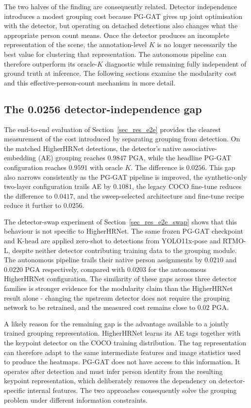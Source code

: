 The two halves of the finding are consequently related.
Detector independence introduces a modest grouping cost because PG-GAT
gives up joint optimisation with the detector,
but operating on detached detections also changes what the appropriate
person count means.
Once the detector produces an incomplete representation of the scene,
the annotation-level $K$ is no longer necessarily the best value for
clustering that representation.
The autonomous pipeline can therefore outperform its oracle-$K$
diagnostic while remaining fully independent of ground truth at inference.
The following sections examine the modularity cost and this
effective-person-count mechanism in more detail.

\subsection{The 0.0256 detector-independence gap}
\label{sec_disc_modularity_autonomy_gap}

The end-to-end evaluation of Section~\ref{sec_res_e2e} provides the
clearest measurement of the cost introduced by separating grouping from
detection.
On the matched HigherHRNet detections, the detector's native
associative-embedding (AE) grouping reaches $0.9847$ PGA,
while the headline PG-GAT configuration reaches $0.9591$ with oracle $K$.
The difference is $0.0256$.
This gap also narrows consistently as the PG-GAT pipeline is improved,
the synthetic-only two-layer configuration trails AE by $0.1081$,
the legacy COCO fine-tune reduces the difference to $0.0417$,
and the sweep-selected architecture and fine-tune recipe reduce it
further to $0.0256$.

The detector-swap experiment of Section~\ref{sec_res_e2e_swap} shows
that this behaviour is not specific to HigherHRNet.
The same frozen PG-GAT checkpoint and K-head are applied zero-shot to
detections from YOLO11x-pose and RTMO-L,
despite neither detector contributing training data to the grouping module.
The autonomous pipeline trails their native person assignments by
$0.0210$ and $0.0220$ PGA respectively,
compared with $0.0203$ for the autonomous HigherHRNet configuration.
The similarity of these gaps across three detector families is stronger
evidence for the modularity claim than the HigherHRNet result alone -
changing the upstream detector does not require the grouping network
to be retrained,
and the measured cost remains close to $0.02$ PGA.

A likely reason for the remaining gap is the advantage available to a
jointly trained grouping representation.
HigherHRNet learns its AE tags together with the keypoint detector on
the COCO training distribution.
The tag representation can therefore adapt to the same intermediate
features and image statistics used to produce the heatmaps.
PG-GAT does not have access to this information.
It operates after detection and must infer person identity from the
resulting keypoint representation,
which deliberately removes the dependency on detector-specific internal
features.
The two approaches consequently solve the grouping problem under
different information constraints.

